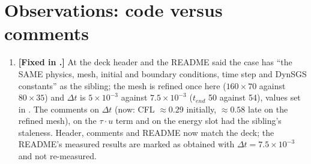 \documentclass[10pt]{article}
\begin{document}
\section{Observations: code versus comments}
\begin{enumerate}[leftmargin=*]
\item \textbf{[Fixed in .]} At \commit{} the deck header and the README said the case has ``the
SAME physics, mesh, initial and boundary conditions, time step and DynSGS constants'' as the sibling; the mesh is
refined once here ($160\times70$ against $80\times35$) and $\Delta t$ is $5\times10^{-3}$ against
$7.5\times10^{-3}$ ($t_{end}$ 50 against 54), values set in . The comments on $\Delta t$ (now:
CFL $\approx0.29$ initially, $\approx0.58$ late on the refined mesh), on the $\tau\cdot u$ term and on the energy
slot had the sibling's staleness. Header, comments and README now match the deck; the README's measured results
are marked as obtained with $\Delta t=7.5\times10^{-3}$ and not re-measured.
\end{enumerate}


\end{document}
